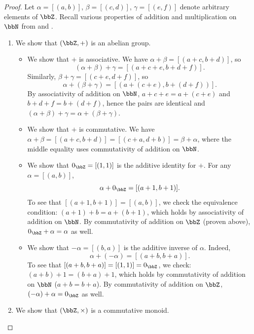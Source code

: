 \begin{proof}
Let $\alpha = [(a,b)]$, $\beta = [(c,d)]$, $\gamma = [(e,f)]$ denote arbitrary elements of $\bbZ$. Recall various properties of addition and multiplication on $\bbN$ from  and . 

\begin{enumerate}
    \item We show that $(\bbZ, +)$ is an abelian group.

    \begin{itemize}
        
        \item We show that $+$ is associative.  We have $\alpha + \beta = [(a+c, b+d)]$, so
        $$(\alpha + \beta) + \gamma = [(a+c+e, b+d+f)].$$
        Similarly, $\beta + \gamma = [(c+e, d+f)]$, so
        $$\alpha + (\beta + \gamma) = [(a+(c+e), b+(d+f))].$$
        By associativity of addition on $\bbN$, $a+c+e = a+(c+e)$ and $b+d+f = b+(d+f)$, hence the pairs are identical and $(\alpha+\beta)+\gamma = \alpha+(\beta+\gamma)$.

        \item We show that $+$ is commutative. We have $\alpha + \beta = [(a+c, b+d)] = [(c+a, d+b)] = \beta + \alpha$, where the middle equality uses commutativity of addition on $\bbN$.

        \item We show that $0_\bbZ = [(1,1)]$ is the additive identity for $+$. For any $\alpha = [(a,b)]$,
        $$\alpha + 0_\bbZ = [(a+1, b+1)].$$
        To see that $[(a+1, b+1)] = [(a,b)]$, we check the equivalence condition: $(a+1) + b = a + (b+1)$, which holds by associativity of addition on $\bbN$. By commutativity of addition on $\bbZ$ (proven above), $0_\bbZ + \alpha = \alpha$ as well.

        \item We show that $-\alpha = [(b,a)]$ is the additive inverse of $\alpha$. Indeed,
        $$\alpha + (-\alpha) = [(a+b, b+a)].$$
        To see that $[(a+b, b+a)] = [(1,1)] = 0_\bbZ$, we check: $(a+b) + 1 = (b+a) + 1$, which holds by commutativity of addition on $\bbN$ ($a+b = b+a$). By commutativity of addition on $\bbZ$, $(-\alpha) + \alpha = 0_\bbZ$ as well.

    \end{itemize}


    \item We show that $(\bbZ, \times)$ is a commutative monoid.


\end{enumerate}
\end{proof}
